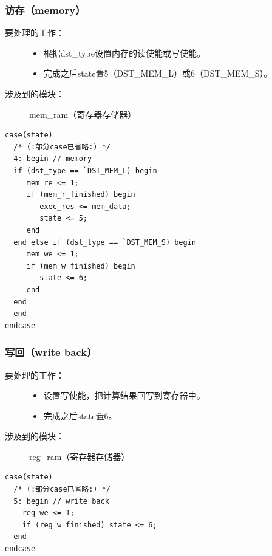 \documentclass[12pt,a4paper,UTF8]{article}
\begin{document}
\subsubsection{访存（memory）}
\begin{description}
  \item[要处理的工作：] \hspace*{\fill}
        \begin{itemize}
          \item 根据dst\_type设置内存的读使能或写使能。
          \item 完成之后state置5（DST\_MEM\_L）或6（DST\_MEM\_S）。
        \end{itemize}
  \item[涉及到的模块：] mem\_ram（寄存器存储器）
\end{description}

\begin{lstlisting}[style=verilog-style]
case(state)
  /* (:部分case已省略:) */
  4: begin // memory
  if (dst_type == `DST_MEM_L) begin
     mem_re <= 1;
     if (mem_r_finished) begin
        exec_res <= mem_data;
        state <= 5;
     end
  end else if (dst_type == `DST_MEM_S) begin
     mem_we <= 1;
     if (mem_w_finished) begin
        state <= 6;
     end
  end
  end
endcase
\end{lstlisting}

\subsubsection{写回（write back）}
\begin{description}
  \item[要处理的工作：] \hspace*{\fill}
        \begin{itemize}
          \item 设置写使能，把计算结果回写到寄存器中。
          \item 完成之后state置6。
        \end{itemize}
  \item[涉及到的模块：] reg\_ram（寄存器存储器）
\end{description}

\begin{lstlisting}[style=verilog-style]
case(state)
  /* (:部分case已省略:) */
  5: begin // write back
    reg_we <= 1;
    if (reg_w_finished) state <= 6;
  end
endcase
\end{lstlisting}
\end{document}
